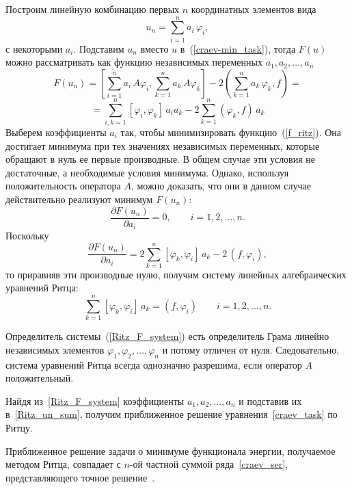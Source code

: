 \documentclass[12pt, a4paper]{article}
\begin{document}
Построим линейную комбинацию первых $n$ координатных элементов вида
\begin{equation}\label{Ritz_un_sum}
	u_n = \sum_{i = 1}^n a_i \, \varphi_i,
\end{equation}
с некоторыми $a_i$. Подставим $u_n$ вместо $u$ в~(\ref{craev-min_task}), тогда $F(u)$ можно рассматривать как функцию
независимых переменных $a_1, a_2, \ldots, a_n$
\begin{equation}
	\label{f_ritz}
	F(u_n) = \left[\sum_{i = 1}^n a_i \, A\varphi_i,
	\sum_{k = 1}^n a_k \, A\varphi_k \right] -
	2\left(\sum_{k = 1}^n a_k \, \varphi_k, f \right) =
\end{equation}
\[
	= \sum_{i,k = 1}^n [\varphi_i, \varphi_k] \, a_i a_k -
	2\sum_{k = 1}^n (\varphi_k, f) \, a_k
\]
Выберем коэффициенты $a_i$ так, чтобы минимизировать функцию~(\ref{f_ritz}). Она достигает минимума при тех значениях независимых переменных, которые обращают в нуль ее первые производные. В общем случае эти условия не достаточные, а необходимые условия минимума. Однако, используя положительность оператора $A$, можно доказать, что они в данном случае действительно реализуют минимум $F(u_n)$:
\begin{equation}\label{system_zero_ritz}
	\frac{\partial F(u_n)}{\partial a_i} = 0, \qquad i = 1, 2, \ldots, n.
\end{equation}
Поскольку
\[
	\frac{\partial F(u_n)}{\partial a_i} =
	2 \sum_{k = 1}^n [\varphi_k, \varphi_i] \, a_k - 2\,(f, \varphi_i),
\]
то приравняв эти производные нулю, получим систему линейных алгебраических уравнений  Ритца:
\begin{equation}\label{Ritz_F_system}
	\sum_{k = 1}^n [\varphi_k, \varphi_i] \, a_k = (f, \varphi_i) \qquad
	i = 1, 2, \ldots, n.
\end{equation}

Определитель системы~(\ref{Ritz_F_system})
есть определитель Грама линейно независимых элементов
$\varphi_1, \varphi_2, \ldots, \varphi_n$ и потому отличен от нуля. Следовательно,
система уравнений Ритца всегда однозначно разрешима, если оператор $A$ положительный.

Найдя из~\eqref{Ritz_F_system} коэффициенты $a_1, a_2, \ldots, a_n$ и
подставив их в~\eqref{Ritz_un_sum}, получим приближенное решение уравнения~\eqref{craev_task} по Ритцу.

Приближенное решение задачи о минимуме функционала
энергии, получаемое методом Ритца, совпадает с $n$-ой частной
суммой ряда~\eqref{craev_ser}, представляющего точное решение~\cite{Michilin}.
\end{document}
